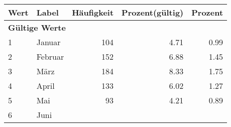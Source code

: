      \begin{longtable}{lXrrr}
     \toprule
     \textbf{Wert} & \textbf{Label} & \textbf{Häufigkeit} & \textbf{Prozent(gültig)} & \textbf{Prozent} \\
     \endhead
     \midrule
     \multicolumn{5}{l}{\textbf{Gültige Werte}}\\

     1 &
     \multicolumn{1}{X}{ Januar   } &


       \num{104} &
       \num[round-mode=places,round-precision=2]{4.71} &
         \num[round-mode=places,round-precision=2]{0.99} \\

     2 &
     \multicolumn{1}{X}{ Februar   } &


       \num{152} &
       \num[round-mode=places,round-precision=2]{6.88} &
         \num[round-mode=places,round-precision=2]{1.45} \\

     3 &
     \multicolumn{1}{X}{ März   } &


       \num{184} &
       \num[round-mode=places,round-precision=2]{8.33} &
         \num[round-mode=places,round-precision=2]{1.75} \\

     4 &
     \multicolumn{1}{X}{ April   } &


       \num{133} &
       \num[round-mode=places,round-precision=2]{6.02} &
         \num[round-mode=places,round-precision=2]{1.27} \\

     5 &
     \multicolumn{1}{X}{ Mai   } &


       \num{93} &
       \num[round-mode=places,round-precision=2]{4.21} &
         \num[round-mode=places,round-precision=2]{0.89} \\

     6 &
     \multicolumn{1}{X}{ Juni   } &



\end{longtable}
